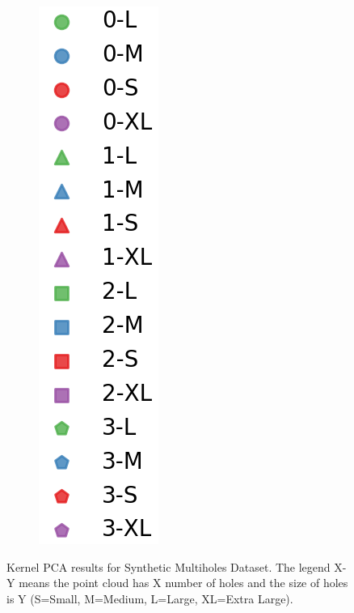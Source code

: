 \documentclass[10pt]{article}
\begin{document}
\begin{figure}[H]
\begin{subfigure}[h]{0.05\textwidth}
        \includegraphics[width=\linewidth]{mh_legend}
    \end{subfigure}%
    \caption{Kernel PCA results for Synthetic Multiholes Dataset. The legend X-Y means the point cloud has X number of holes and the size of holes is Y (S=Small, M=Medium, L=Large, XL=Extra Large).}
\end{figure}
\end{document}
